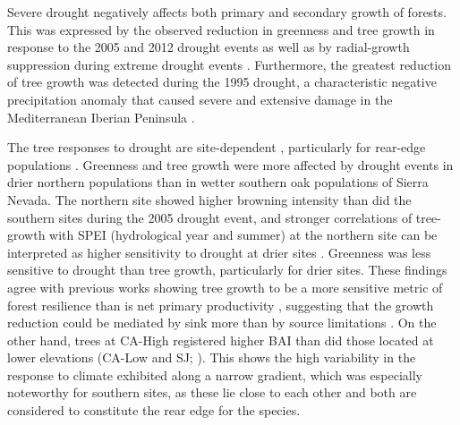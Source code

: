Severe drought negatively affects both primary and secondary growth of \Qp forests. This was expressed by the observed reduction in greenness and tree growth in response to the 2005 and 2012 drought events as well as by radial-growth suppression during extreme drought events \autocite{Corcueraetal2006RadialgrowthWoodanatomical,GeaIzquierdoCanellas2014LocalClimate}. Furthermore, the greatest reduction of tree growth was detected during the 1995 drought, a characteristic negative precipitation anomaly that caused severe and extensive damage in the Mediterranean Iberian Peninsula \autocite{Penuelasetal2001SevereDrought,Gazoletal2018ForestResilience}.

The tree responses to drought are site-dependent \autocite{Babstetal2013SiteSpecies}, particularly for rear-edge populations \autocite{CavinJump2017HighestDrought,DoradoLinanetal2017LargescaleAtmospheric}. Greenness and tree growth were more affected by drought events in drier northern populations than in wetter southern oak populations of Sierra Nevada. The northern site showed higher browning intensity than did the southern sites during the 2005 drought event, and stronger correlations of tree-growth with SPEI (hydrological year and summer) at the northern site can be interpreted as higher sensitivity to drought at drier sites \autocite{GeaIzquierdoCanellas2014LocalClimate}. Greenness was less sensitive to drought than tree growth, particularly for drier sites. These findings agree with previous works showing tree growth to be a more sensitive metric of forest resilience than is net primary productivity \autocites[\emph{e.g.}][]{Babstetal2013SiteSpecies,Coulthardetal2017TreeGrowth,Gazoletal2018ForestResilience,PenaGallardoetal2018DroughtSensitiveness}, suggesting that the growth reduction could be mediated by sink more than by source limitations \autocite{Korner2013GrowthControls,Fatichietal2014MovingPhotosynthesis}. On the other hand, trees at CA-High registered higher BAI than did those located at lower elevations (CA-Low and SJ; ). This shows the high variability in the response to climate exhibited along a narrow gradient, which was especially noteworthy for southern sites, as these lie close to each other and both are considered to constitute the rear edge for the species.

